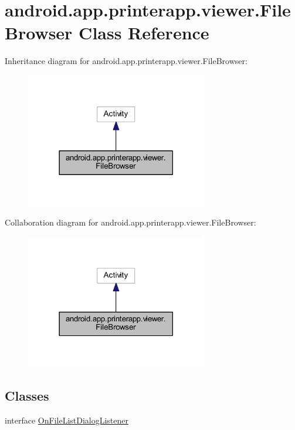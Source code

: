 \hypertarget{classandroid_1_1app_1_1printerapp_1_1viewer_1_1_file_browser}{}\section{android.\+app.\+printerapp.\+viewer.\+File\+Browser Class Reference}
\label{classandroid_1_1app_1_1printerapp_1_1viewer_1_1_file_browser}


Inheritance diagram for android.\+app.\+printerapp.\+viewer.\+File\+Browser\+:
\nopagebreak
\begin{figure}[H]
\begin{center}
\leavevmode
\includegraphics[width=225pt]{classandroid_1_1app_1_1printerapp_1_1viewer_1_1_file_browser__inherit__graph}
\end{center}
\end{figure}


Collaboration diagram for android.\+app.\+printerapp.\+viewer.\+File\+Browser\+:
\nopagebreak
\begin{figure}[H]
\begin{center}
\leavevmode
\includegraphics[width=225pt]{classandroid_1_1app_1_1printerapp_1_1viewer_1_1_file_browser__coll__graph}
\end{center}
\end{figure}
\subsection*{Classes}
\begin{DoxyCompactItemize}
\item 
interface \hyperlink{interfaceandroid_1_1app_1_1printerapp_1_1viewer_1_1_file_browser_1_1_on_file_list_dialog_listener}{On\+File\+List\+Dialog\+Listener}
\end{DoxyCompactItemize}
